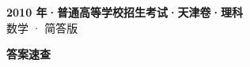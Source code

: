 \documentclass[zihao=-4, a4paper]{ctexart}
\begin{document}
\begin{center}
  {\Large\bfseries 2010 年·普通高等学校招生考试·天津卷·理科}\\[4pt]
  {\large 数学 · 简答版}
\end{center}
\medskip
{}

\clearpage
{}
\begin{center}{\Large\bfseries 答案速查}\end{center}
\medskip

\end{document}
